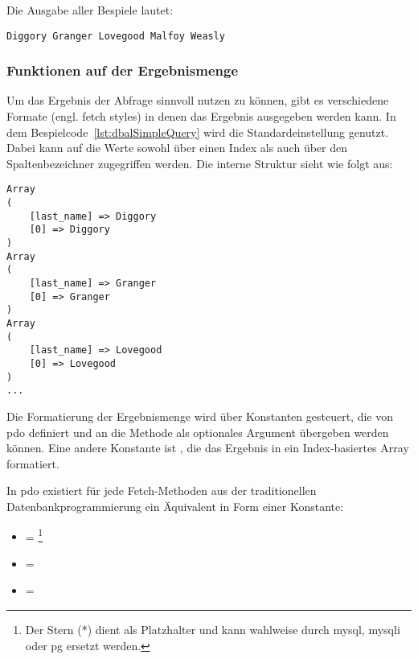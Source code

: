 Die Ausgabe aller Bespiele lautet:
\begin{Verbatim}
Diggory Granger Lovegood Malfoy Weasly
\end{Verbatim}

\subsubsection{Funktionen auf der Ergebnismenge}
\label{basics:doctrine:subsubsec:resultSet}
Um das Ergebnis der Abfrage sinnvoll nutzen zu können, gibt es verschiedene Formate (engl. fetch styles) in denen das Ergebnis ausgegeben werden kann. In dem Bespielcode~\ref{lst:dbalSimpleQuery} wird die Standardeinstellung  genutzt. Dabei kann auf die Werte sowohl über einen Index als auch über den Spaltenbezeichner zugegriffen werden. Die interne Struktur sieht wie folgt aus:

\begin{listing}[H]
\caption{}
\label{lst:internalStructureOfFetchBoth}
\end{listing}

\begin{Verbatim}
Array
(
    [last_name] => Diggory
    [0] => Diggory
)
Array
(
    [last_name] => Granger
    [0] => Granger
)
Array
(
    [last_name] => Lovegood
    [0] => Lovegood
)
...
\end{Verbatim}

Die Formatierung der Ergebnismenge wird über Konstanten gesteuert, die von \gls{pdo} definiert und an die Methode  als optionales Argument übergeben werden können. Eine andere Konstante ist , die das Ergebnis in ein Index-basiertes Array formatiert.

\begin{listing}[H]
\label{lst:fetchNum}
\end{listing}

In \gls{pdo} existiert für jede Fetch-Methoden aus der traditionellen Datenbankprogrammierung ein Äquivalent in Form einer Konstante:

\begin{itemize}
	\item {} = \footnote{Der Stern (*) dient als Platzhalter und kann wahlweise durch mysql, mysqli oder pg ersetzt werden.}
	\item {} = 
	\item {} = 
\end{itemize}

